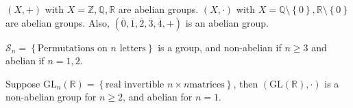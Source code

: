 \begin{eg}
    \((X, +)\) with \(X = \mathbb{Z} , \mathbb{Q} , \mathbb{R} \) are abelian groups. \((X, \cdot)\) with \(X=\mathbb{Q} \setminus \left\{ 0 \right\} , \mathbb{R} \setminus \left\{ 0 \right\} \) are abelian groups. Also, \((\overline{0}, \overline{1}, \overline{2}, \overline{3} , \overline{4} , +)\) is an abelian group.      
\end{eg}

\begin{eg}
    \(\mathcal{S}_n = \left\{ \text{Permutations on } n \text{ letters} \right\} \) is a group, and non-abelian if \(n \ge 3\) and abelian if \(n = 1, 2\).   
\end{eg}

\begin{eg}
    Suppose \(\mathrm{GL}_n(\mathbb{R}) = \left\{ \text{real invertible } n \times n \text{matrices} \right\}\), then \((\mathrm{GL}(\mathbb{R} ), \cdot) \) is a non-abelian group for \(n \ge 2\), and abelian for \(n = 1\).   
\end{eg}

